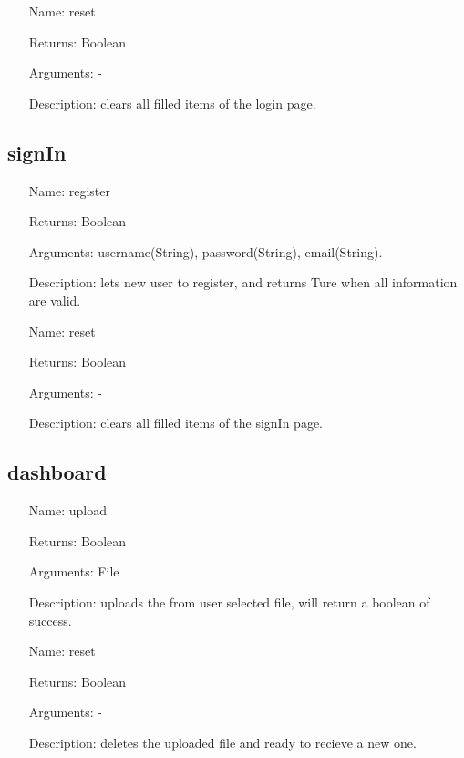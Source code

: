 \documentclass[runningheads]{llncs}
\begin{document}
\begin{itemize}
	\item[Name:] reset
	\item[Returns:] Boolean
	\item[Arguments:] -
	\item[Description:] clears all filled items of the login page.
\end{itemize}

\subsection{signIn}
\begin{itemize}
	\item[Name:] register
	\item[Returns:] Boolean
	\item[Arguments:] username(String), password(String), email(String).
	\item[Description:] lets new user to register, and returns Ture when all information are valid.
\end{itemize}


\begin{itemize}
	\item[Name:] reset
	\item[Returns:] Boolean
	\item[Arguments:] -
	\item[Description:] clears all filled items of the signIn page.
\end{itemize}

\subsection{dashboard}
\begin{itemize}
	\item[Name:] upload
	\item[Returns:] Boolean
	\item[Arguments:] File
	\item[Description:] uploads the from user selected file, will return a boolean of success.
\end{itemize}

\begin{itemize}
	\item[Name:] reset
	\item[Returns:] Boolean
	\item[Arguments:] -
	\item[Description:] deletes the uploaded file and ready to recieve a new one.
\end{itemize}
\end{document}
